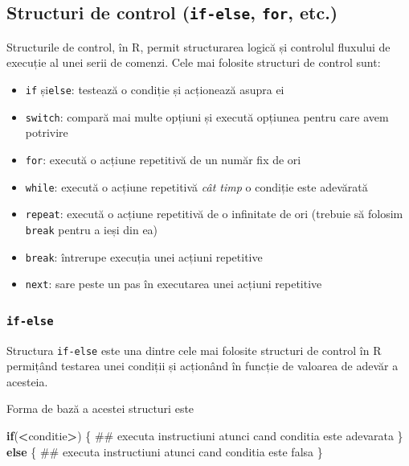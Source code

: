 \documentclass[]{article}
\newenvironment{Shaded}{\begin{snugshade}}{\end{snugshade}}
\newcommand{\ControlFlowTok}[1]{\textcolor[rgb]{0.13,0.29,0.53}{\textbf{#1}}}
\newcommand{\OperatorTok}[1]{\textcolor[rgb]{0.81,0.36,0.00}{\textbf{#1}}}
\newcommand{\NormalTok}[1]{#1}
\begin{document}
\subsection{\texorpdfstring{Structuri de control (\texttt{if-else},
\texttt{for},
etc.)}{Structuri de control (if-else, for, etc.)}}\label{structuri-de-control-if-else-for-etc.}

Structurile de control, în R, permit structurarea logică și controlul
fluxului de execuție al unei serii de comenzi. Cele mai folosite
structuri de control sunt:

\begin{itemize}
\item
  \texttt{if} și\texttt{else}: testează o condiție și acționează asupra
  ei
\item
  \texttt{switch}: compară mai multe opțiuni și execută opțiunea pentru
  care avem potrivire
\item
  \texttt{for}: execută o acțiune repetitivă de un număr fix de ori
\item
  \texttt{while}: execută o acțiune repetitivă \emph{cât timp} o
  condiție este adevărată
\item
  \texttt{repeat}: execută o acțiune repetitivă de o infinitate de ori
  (trebuie să folosim \texttt{break} pentru a ieși din ea)
\item
  \texttt{break}: întrerupe execuția unei acțiuni repetitive
\item
  \texttt{next}: sare peste un pas în executarea unei acțiuni repetitive
\end{itemize}

\subsubsection{\texorpdfstring{\texttt{if-else}}{if-else}}\label{if-else}

Structura \texttt{if-else} este una dintre cele mai folosite structuri
de control în R permițând testarea unei condiții și acționând în funcție
de valoarea de adevăr a acesteia.

Forma de bază a acestei structuri este

\begin{Shaded}
\begin{Highlighting}[]
\ControlFlowTok{if}\NormalTok{(}\OperatorTok{<}\NormalTok{conditie}\OperatorTok{>}\NormalTok{) \{}
\NormalTok{        ## executa instructiuni atunci cand conditia este adevarata}
\NormalTok{\} }
\ControlFlowTok{else}\NormalTok{ \{}
\NormalTok{        ## executa instructiuni atunci cand conditia este falsa}
\NormalTok{\}}
\end{Highlighting}
\end{Shaded}
\end{document}
